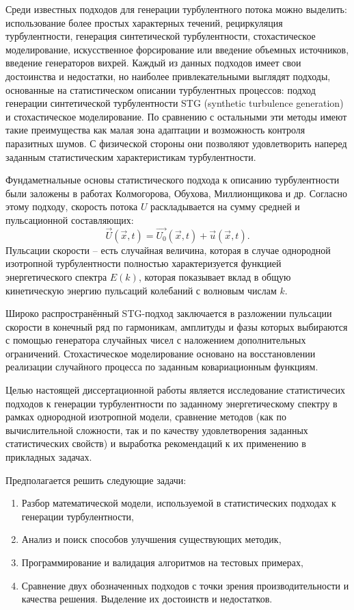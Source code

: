 Среди известных подходов для генерации турбулентного потока можно выделить:
использование более простых характерных течений,
рециркуляция турбулентности,
генерация синтетической турбулентности,
стохастическое моделирование,
искусственное форсирование или введение объемных источников, введение генераторов вихрей.
Каждый из данных подходов имеет свои достоинства и недостатки, но наиболее привлекательными выглядят
подходы, основанные на статистическом описании турбулентных процессов:
подход генерации синтетической турбулентности STG (synthetic turbulence generation) и стохастическое моделирование.
По сравнению с остальными эти методы имеют такие преимущества как малая зона адаптации и возможность контроля паразитных шумов.
С физической стороны они позволяют удовлетворить наперед заданным статистическим характеристикам турбулентности.  

Фундаметнальные основы статистического подхода к описанию турбулентности были заложены в работах Колмогорова, Обухова, Миллионщикова и др. 
Согласно этому подходу, скорость потока $U$ раскладывается на сумму средней и пульсационной 
составляющих:
$$\vec{U}\left(\vec{x}, t\right) = \vec{U_0}\left(\vec{x}, t\right)  + \vec{u}\left(\vec{x}, t\right).$$
Пульсации скорости -- есть случайная величина, которая в случае однородной изотропной
турбулентности полностью характеризуется функцией энергетического спектра $E(k)$,
которая показывает вклад в общую кинетическую энергию пульсаций колебаний с волновым числам $k$.

Широко распространённый STG-подход заключается в разложении пульсации скорости в конечный ряд по гармоникам,
амплитуды и фазы которых выбираются с помощью генератора случайных чисел с наложением дополнительных ограничений.
Стохастическое моделирование основано на восстановлении реализации случайного процесса по заданным ковариационным функциям.

Целью настоящей диссертационной работы является исследование статистичесих подходов к генерации турбулентности
по заданному энергетическому спектру в рамках однородной изотропной модели,
сравнение методов (как по вычислительной сложности, так и по качеству удовлетворения заданных статистических свойств) и 
выработка рекомендаций к их применению в прикладных задачах.

Предполагается решить следующие задачи:
\begin{enumerate}
	\item Разбор математической модели, используемой в статистических подходах к генерации турбулентности,
	\item Анализ и поиск способов улучшения существующих методик,
	\item Программирование и валидация алгоритмов на тестовых примерах,
	\item Сравнение двух обозначенных подходов с точки зрения производительности и качества решения. Выделение их достоинств и недостатков.
\end{enumerate}
